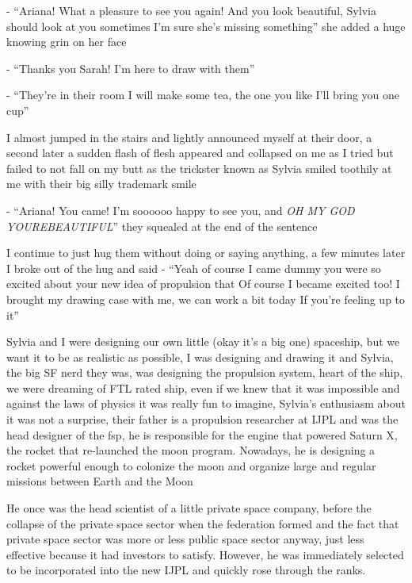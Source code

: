 \documentclass[colorlinks,12pt,a4paper]{book}
\begin{document}
- “Ariana! What a pleasure to see you again! And you look beautiful, 
Sylvia should look at you sometimes I'm sure she's missing something” she added a huge knowing grin on her face\par
- “Thanks you Sarah! I'm here to draw with them”\par 
- “They're in their room I will make some tea, the one you like I'll bring you one cup”\par
\bigskip

I almost jumped in the stairs and lightly announced myself at their door, 
a second later a sudden flash of flesh appeared and collapsed on me as 
I tried but failed to not fall on my butt as the trickster known as Sylvia smiled 
toothily at me with their big silly trademark smile\newline

- “Ariana! You came! I'm soooooo happy to see you, and \textit{OH MY GOD YOUREBEAUTIFUL}” they squealed at the end of the sentence\par
\bigskip

I continue to just hug them without doing or saying anything, a few minutes later I broke out of the hug and said\newline
- “Yeah of course I came dummy you were so excited about your new idea of propulsion that 
Of course I became excited too! I brought my drawing case with me, we can work a bit today If you're feeling up to it”\par
\bigskip

Sylvia and I were designing our own little (okay it's a big one) spaceship,
 but we want it to be as realistic as possible, I was designing and drawing it and Sylvia, 
 the big SF nerd they was, was designing the propulsion system, heart of the ship, 
 we were dreaming of FTL rated ship, even if we knew that it was impossible and against the laws of physics 
 it was really fun to imagine, Sylvia's enthusiasm about it was not a surprise, their father is a propulsion 
 researcher at IJPL and was the head designer of the \gls{fsp}, he is responsible for the engine 
 that powered Saturn X, the rocket that re-launched the moon program. Nowadays, he is designing a rocket powerful 
 enough to colonize the moon and organize large and regular missions between Earth and the Moon\par
 \bigskip

He once was the head scientist of a little private space company, 
before the collapse of the private space sector when the federation formed 
and the fact that private space sector was more or less public space sector anyway, just less effective because 
it had investors to satisfy. However, he was immediately selected to be incorporated into the new IJPL and
quickly rose through the ranks.\par
\bigskip
\end{document}
